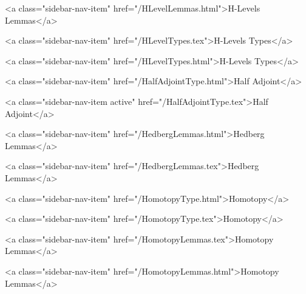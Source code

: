       
        
          <a class="sidebar-nav-item" href="/HLevelLemmas.html">H-Levels Lemmas</a>
        
      
    
      
        
          <a class="sidebar-nav-item" href="/HLevelTypes.tex">H-Levels Types</a>
        
      
    
      
        
          <a class="sidebar-nav-item" href="/HLevelTypes.html">H-Levels Types</a>
        
      
    
      
        
          <a class="sidebar-nav-item" href="/HalfAdjointType.html">Half Adjoint</a>
        
      
    
      
        
          <a class="sidebar-nav-item active" href="/HalfAdjointType.tex">Half Adjoint</a>
        
      
    
      
        
          <a class="sidebar-nav-item" href="/HedbergLemmas.html">Hedberg Lemmas</a>
        
      
    
      
        
          <a class="sidebar-nav-item" href="/HedbergLemmas.tex">Hedberg Lemmas</a>
        
      
    
      
        
          <a class="sidebar-nav-item" href="/HomotopyType.html">Homotopy</a>
        
      
    
      
        
          <a class="sidebar-nav-item" href="/HomotopyType.tex">Homotopy</a>
        
      
    
      
        
          <a class="sidebar-nav-item" href="/HomotopyLemmas.tex">Homotopy Lemmas</a>
        
      
    
      
        
          <a class="sidebar-nav-item" href="/HomotopyLemmas.html">Homotopy Lemmas</a>
        
      
    
